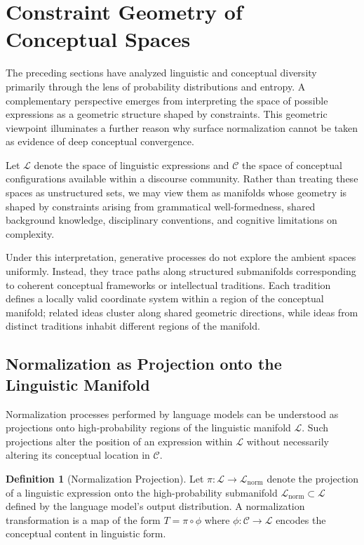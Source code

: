 \documentclass[12pt,a4paper]{article}
\theoremstyle{definition}
\newtheorem{definition}{Definition}[section]
\theoremstyle{plain}
\theoremstyle{remark}
\newcommand{\calL}{\mathcal{L}}
\newcommand{\calC}{\mathcal{C}}
\begin{document}
\section{Constraint Geometry of Conceptual Spaces}
\label{sec:constraints}

The preceding sections have analyzed linguistic and conceptual diversity primarily through
the lens of probability distributions and entropy. A complementary perspective emerges from
interpreting the space of possible expressions as a geometric structure shaped by constraints.
This geometric viewpoint illuminates a further reason why surface normalization cannot be
taken as evidence of deep conceptual convergence.

Let $\calL$ denote the space of linguistic expressions and $\calC$ the space of conceptual
configurations available within a discourse community. Rather than treating these spaces as
unstructured sets, we may view them as manifolds whose geometry is shaped by constraints
arising from grammatical well-formedness, shared background knowledge, disciplinary
conventions, and cognitive limitations on complexity.

Under this interpretation, generative processes do not explore the ambient spaces uniformly.
Instead, they trace paths along structured submanifolds corresponding to coherent conceptual
frameworks or intellectual traditions. Each tradition defines a locally valid coordinate
system within a region of the conceptual manifold; related ideas cluster along shared
geometric directions, while ideas from distinct traditions inhabit different regions of the
manifold.

\subsection{Normalization as Projection onto the Linguistic Manifold}

Normalization processes performed by language models can be understood as projections onto
high-probability regions of the linguistic manifold $\calL$. Such projections alter the
position of an expression within $\calL$ without necessarily altering its conceptual
location in $\calC$.

\begin{definition}[Normalization Projection]
Let $\pi : \calL \to \calL_{\mathrm{norm}}$ denote the projection of a linguistic expression
onto the high-probability submanifold $\calL_{\mathrm{norm}} \subset \calL$ defined by the
language model's output distribution. A normalization transformation is a map of the form
$T = \pi \circ \phi$ where $\phi : \calC \to \calL$ encodes the conceptual content in
linguistic form.
\end{definition}
\end{document}
